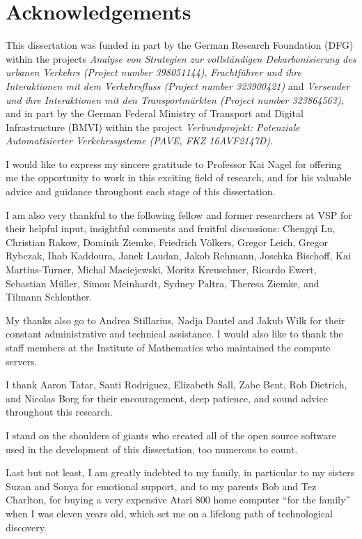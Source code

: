
\thispagestyle{empty}

\chapter*{Acknowledgements}

This dissertation was funded in part by the German Research Foundation (DFG) within the projects
\emph{Analyse von Strategien zur vollständigen Dekarbonisierung des urbanen Verkehrs (Project number 398051144)},
\emph{Frachtführer und ihre Interaktionen mit dem Verkehrsfluss (Project number 323900421)} and
\emph{Versender und ihre Interaktionen mit den Transportmärkten (Project number 323864563)},
and in part by the German Federal Ministry of Transport and Digital Infrastructure (BMVI) within the project
\emph{Verbundprojekt: Potenziale Automatisierter Verkehrssysteme (PAVE, FKZ 16AVF2147D)}.

I would like to express my sincere gratitude to Professor Kai Nagel for offering me the opportunity to work in this exciting field of research, and for his valuable advice and guidance throughout each stage of this dissertation.

I am also very thankful to the following fellow and former researchers at VSP for their helpful input, insightful comments and fruitful discussions:
Chengqi Lu,
Christian Rakow,
Dominik Ziemke,
Friedrich Völkers,
Gregor Leich,
Gregor Rybczak,
Ihab Kaddoura,
Janek Laudan,
Jakob Rehmann,
Joschka Bischoff,
Kai Martins-Turner,
Michal Maciejewski,
Moritz Kreuschner,
Ricardo Ewert,
Sebastian Müller,
Simon Meinhardt,
Sydney Paltra,
Theresa Ziemke,
and Tilmann Schlenther.

My thanks also go to Andrea Stillarius, Nadja Dautel and Jakub Wilk for their constant administrative and technical assistance. I would also like to thank the staff members at the Institute of Mathematics who maintained the compute servers.

I thank Aaron Tatar, Santi Rodriguez, Elizabeth Sall, Zabe Bent, Rob Dietrich, and Nicolas Borg for their encouragement, deep patience, and sound advice throughout this research.

I stand on the shoulders of giants who created all of the open source software used in the development of this dissertation, too numerous to count.

Last but not least, I am greatly indebted to my family, in particular to my sisters Suzan and Sonya for emotional support, and to my parents Bob and Tez Charlton, for buying a very expensive Atari 800 home computer ``for the family'' when I was eleven years old, which set me on a lifelong path of technological discovery.

\newpage
